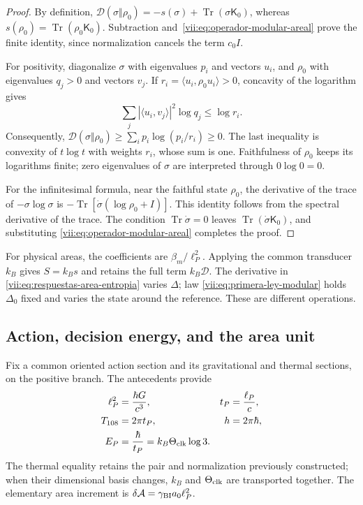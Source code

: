 \begin{proof}
By definition,
\(\mathcal D(\sigma\Vert\rho_0)=-s(\sigma)
+\operatorname{Tr}(\sigma\mathsf K_0)\), whereas
\(s(\rho_0)=\operatorname{Tr}(\rho_0\mathsf K_0)\).
Subtraction and~\eqref{vii:eq:operador-modular-areal} prove the finite
identity, since normalization cancels the term \(c_0I\).

For positivity, diagonalize \(\sigma\) with eigenvalues
\(p_i\) and vectors \(u_i\), and \(\rho_0\) with eigenvalues
\(q_j>0\) and vectors \(v_j\). If
\(r_i=\langle u_i,\rho_0u_i\rangle>0\), concavity of the
logarithm gives
\[
 \sum_j|\langle u_i,v_j\rangle|^2\log q_j\le\log r_i.
\]
Consequently,
\(\mathcal D(\sigma\Vert\rho_0)
\ge\sum_i p_i\log(p_i/r_i)\ge0\).
The last inequality is convexity of \(t\log t\) with weights
\(r_i\), whose sum is one. Faithfulness of \(\rho_0\) keeps
its logarithms finite; zero eigenvalues of \(\sigma\) are
interpreted through \(0\log0=0\).

For the infinitesimal formula, near the faithful state \(\rho_0\),
the derivative of the trace of \(-\sigma\log\sigma\) is
\(-\operatorname{Tr}[\dot\sigma(\log\rho_0+I)]\).
This identity follows from the spectral derivative of the trace.
The condition \(\operatorname{Tr}\dot\sigma=0\) leaves
\(\operatorname{Tr}(\dot\sigma\mathsf K_0)\), and substituting
\eqref{vii:eq:operador-modular-areal} completes the proof.
\end{proof}

For physical areas, the coefficients are \(\beta_m/\ell_P^2\).
Applying the common transducer \(k_B\) gives \(S=k_Bs\) and
retains the full term \(k_B\mathcal D\). The derivative in
\eqref{vii:eq:respuestas-area-entropia} varies \(\Delta\); law
\eqref{vii:eq:primera-ley-modular} holds \(\Delta_0\) fixed and
varies the state around the reference. These are different operations.

\subsection{Action, decision energy, and the area unit}
\label{vii:subsec:conversion-informacion-area}

Fix a common oriented action section and its gravitational and
thermal sections, on the positive branch. The antecedents provide
\begin{equation}
 \begin{aligned}
 \ell_P^2&=\frac{\hbar G}{c^3},& t_P&=\frac{\ell_P}{c},\\
 T_{108}&=2\pi t_P,& h&=2\pi\hbar,\\
 E_P&=\frac{\hbar}{t_P}=k_B\Theta_{\rm clk}\log3.&&
 \end{aligned}
 \label{vii:eq:unidad-accion-informacion}
\end{equation}
The thermal equality retains the pair and normalization previously
constructed; when their dimensional basis changes,
\(k_B\) and \(\Theta_{\rm clk}\) are transported together. The elementary area increment is
\(\delta\mathcal A=\gamma_{\rm BI}a_0\ell_P^2\).

